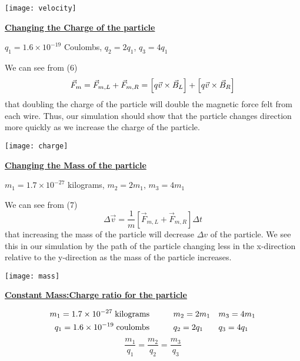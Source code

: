 \documentclass[11pt]{article}
\begin{document}
\begin{center}
\texttt{[image: velocity]}
\end{center}

\newpage
\begin{center}
{\bf\underline{Changing the Charge of the particle}}
\end{center}
\begin{center}
$q_1=1.6\times 10^{-19}$ Coulombs, $q_2=2q_1$, $q_3=4q_1$
\end{center} 

\noindent We can see from (6)
\[
\vec{F}_m=\vec{F}_{m,L}+\vec{F}_{m,R}\\=\left[q\vec{v}\times\vec{B}_L\right]+\left[q\vec{v}\times\vec{B}_R\right]
\]
\noindent that doubling the charge of the particle will double the magnetic force felt from each wire. Thus, our simulation should show that the particle changes direction more quickly as we increase the charge of the particle.
\vspace{.5in}

\begin{center}
\texttt{[image: charge]}
\end{center}

\newpage
\begin{center}
{\bf\underline{Changing the Mass of the particle}}
\end{center}
\begin{center}
$m_1=1.7\times 10^{-27}$ kilograms, $m_2=2m_1$, $m_3=4m_1$
\end{center}

\noindent We can see from (7) 
\[
\Delta\vec{v}=\frac{1}{m}\left[\vec{F}_{m,L}+\vec{F}_{m,R}\right]\Delta t
\]
\noindent that increasing the mass of the particle will decrease $\Delta v$ of the particle. We see this in our simulation by the path of the particle changing less in the x-direction relative to the y-direction as the mass of the particle increases.
\vspace{.5in}

\begin{center}
\texttt{[image: mass]}
\end{center}

\newpage

\begin{center}
{\bf\underline{Constant Mass:Charge ratio for the particle}}
\end{center}
\begin{align*}
m_1=1.7\times 10^{-27}\;\text{kilograms}	&\hspace{.4in}	m_2=2m_1	&&	m_3=4m_1 \\
q_1=1.6\times 10^{-19}\;\text{coulombs}	&\hspace{.4in}	q_2=2q_1	&&	q_3=4q_1
\end{align*}
\vspace{.2in}
\[
\frac{m_1}{q_1}=\frac{m_2}{q_2}=\frac{m_3}{q_3}
\]
\end{document}
